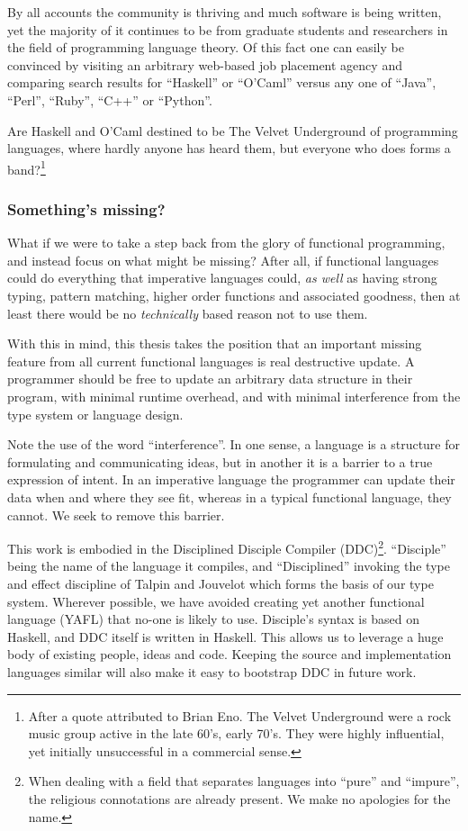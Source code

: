 By all accounts the community is thriving and much software is being written, yet the majority of it continues to be from graduate students and researchers in the field of programming language theory. Of this fact one can easily be convinced by visiting an arbitrary web-based job placement agency and comparing search results for ``Haskell'' or ``O'Caml'' versus any one of ``Java'', ``Perl'', ``Ruby'', ``C++'' or ``Python''.

Are Haskell and O'Caml destined to be The Velvet Underground of programming languages, where hardly anyone has heard them, but everyone who does forms a band?\footnote{After a quote attributed to Brian Eno. The Velvet Underground were a rock music group active in the late 60's, early 70's. They were highly influential, yet initially unsuccessful in a commercial sense.}

\subsubsection{Something's missing?}
What if we were to take a step back from the glory of functional programming, and instead focus on what might be missing? After all, if functional languages could do everything that imperative languages could, \emph{as well} as having strong typing, pattern matching, higher order functions and associated goodness, then at least there would be no \emph{technically} based reason not to use them.

With this in mind, this thesis takes the position that an important missing feature from all current functional languages is real destructive update. A programmer should be free to update an arbitrary data structure in their program, with minimal runtime overhead, and with minimal interference from the type system or language design. 

Note the use of the word ``interference''. In one sense, a language is a structure for formulating and communicating ideas, but in another it is a barrier to a true expression of intent. In an imperative language the programmer can update their data when and where they see fit, whereas in a typical functional language, they cannot. We seek to remove this barrier.

This work is embodied in the Disciplined Disciple Compiler (DDC)\footnote{When dealing with a field that separates languages into ``pure'' and ``impure'', the religious connotations are already present. We make no apologies for the name.}. ``Disciple'' being the name of the language it compiles, and ``Disciplined'' invoking the type and effect discipline \cite{talpin:discipline} of Talpin and Jouvelot which forms the basis of our type system. Wherever possible, we have avoided creating yet another functional language (YAFL) that no-one is likely to use. Disciple's syntax is based on Haskell, and DDC itself is written in Haskell. This allows us to leverage a huge body of existing people, ideas and code.
Keeping the source and implementation languages similar will also make it easy to bootstrap DDC in future work.

